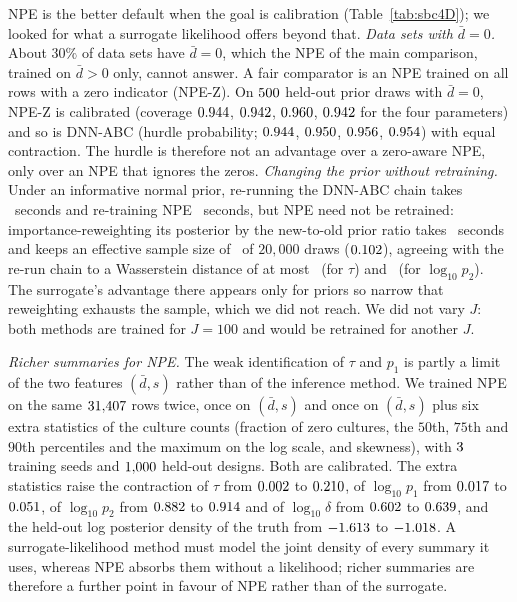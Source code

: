 \documentclass[sn-basic,iicol,pdflatex]{sn-jnl}
\begin{document}
NPE is the better default when the goal is calibration (Table~\ref{tab:sbc4D}); we looked for what a surrogate likelihood offers beyond that.
\emph{Data sets with $\bar d=0$.} About $30\%$ of data sets have $\bar d=0$, which the NPE of the main comparison, trained on $\bar d>0$ only, cannot answer. A fair comparator is an NPE
trained on all rows with a zero indicator (NPE-Z). On $500$ held-out prior draws with $\bar d=0$, NPE-Z is calibrated (coverage $0.944$, $0.942$,
$0.960$, $0.942$ for the four parameters) and so is DNN-ABC (hurdle probability; $0.944$,
$0.950$, $0.956$, $0.954$) with equal contraction. The hurdle is therefore not an advantage over a
zero-aware NPE, only over an NPE that ignores the zeros.
\emph{Changing the prior without retraining.} Under an informative normal prior, re-running the DNN-ABC chain takes \pfourBPriorChangeMeanDnnAbcRerunS\ seconds and re-training NPE
\pfourBNpeRetrainTrainS\ seconds, but NPE need not be retrained: importance-reweighting its posterior by the new-to-old prior ratio takes \pfourBPriorChangeMeanNpeReweightS\ seconds and keeps an effective
sample size of \pfourBPriorChangeMeanNpeEss\ of $20{,}000$ draws ($0.102$), agreeing with the re-run chain to a Wasserstein distance of at most
\pfourBPriorChangeWassDnnVsNpeTau\ (for $\tau$) and \pfourBPriorChangeWassDnnVsNpeLogPTwo\ (for $\log_{10}p_2$). The surrogate's advantage there appears only for priors so narrow that reweighting
exhausts the sample, which we did not reach. We did not vary $J$: both methods are trained for $J=100$ and would be retrained for another $J$.

\emph{Richer summaries for NPE.} The weak identification of $\tau$ and $p_1$ is partly a limit of the two features $(\bar d,s)$ rather than of the inference method. We trained NPE on the same
$31{,}407$ rows twice, once on $(\bar d,s)$ and once on $(\bar d,s)$ plus six extra statistics of the culture counts (fraction of zero cultures, the $50$th, $75$th and $90$th percentiles and the maximum on the log scale, and
skewness), with $3$ training seeds and $1{,}000$ held-out designs. Both are calibrated. The extra statistics raise the contraction of $\tau$ from $0.002$ to
$0.210$, of $\log_{10}p_1$ from $0.017$ to $0.051$, of $\log_{10}p_2$ from $0.882$ to
$0.914$ and of $\log_{10}\delta$ from $0.602$ to $0.639$, and the held-out log posterior density of the truth from
$-1.613$ to $-1.018$. A surrogate-likelihood method must model the joint density of every summary it uses, whereas NPE absorbs them without a likelihood; richer summaries are therefore a further
point in favour of NPE rather than of the surrogate.
\end{document}
